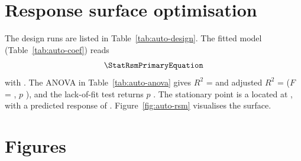 \section{Response surface optimisation}
The design runs are listed in Table~\ref{tab:auto-design}. The fitted model
(Table~\ref{tab:auto-coef}) reads
\begin{equation}
  \StatRsmPrimaryEquation
\end{equation}
with \StatRsmPrimaryFactorLegend. The ANOVA in Table~\ref{tab:auto-anova} gives
$R^{2}$ = \StatRsmPrimaryRsq{} and adjusted $R^{2}$ = \StatRsmPrimaryRsqAdj{}
($F$ = \StatRsmPrimaryFvalue, $p$ \StatRsmPrimaryPval), and the lack-of-fit test returns
$p$ \StatRsmPrimaryLackOfFitPval. The stationary point is a \StatRsmPrimaryOptNature{} located at
\StatRsmPrimaryOptPoint, with a predicted response of \StatRsmPrimaryOptResponse{}
\MetricPrimaryUnit. Figure~\ref{fig:auto-rsm} visualises the surface.
\fi

\section{Figures}


